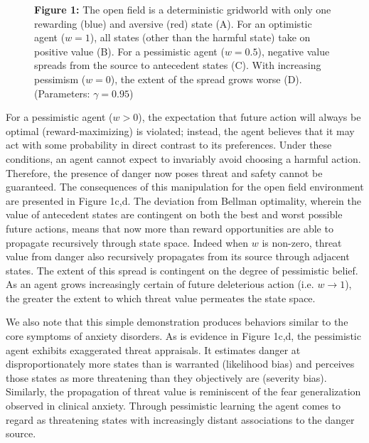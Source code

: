 \documentclass[11pt]{article} %
\begin{document}
\begin{figure}
  \centerline{%
  }
  \par \textbf{Figure 1:} The open field is a deterministic gridworld with only one rewarding (blue) and aversive (red) state (A). For an optimistic agent ($w=1$), all states (other than the harmful state) take on positive value (B). For a pessimistic agent ($w=0.5$), negative value spreads from the source to antecedent states (C). With increasing pessimism ($w=0$), the extent of the spread grows worse (D). (Parameters: $\gamma = 0.95$)
\end{figure}

For a pessimistic agent ($w > 0$), the expectation that future action will always be optimal (reward-maximizing) is violated; instead, the agent believes that it may act with some probability in direct contrast to its preferences. Under these conditions, an agent cannot expect to invariably avoid choosing a harmful action. Therefore, the presence of danger now poses threat and safety cannot be guaranteed. The consequences of this manipulation for the open field environment are presented in Figure 1c,d. The deviation from Bellman optimality, wherein the value of antecedent states are contingent on both the best and worst possible future actions, means that now more than reward opportunities are able to propagate recursively through state space. Indeed when $w$ is non-zero, threat value from danger also recursively propagates from its source through adjacent states. The extent of this spread is contingent on the degree of pessimistic belief. As an agent grows increasingly certain of future deleterious action (i.e. $w \rightarrow 1$), the greater the extent to which threat value permeates the state space.

We also note that this simple demonstration produces behaviors similar to the core symptoms of anxiety disorders. As is evidence in Figure 1c,d, the pessimistic agent exhibits exaggerated threat appraisals. It estimates danger at disproportionately more states than is warranted (likelihood bias) and perceives those states as more threatening than they objectively are (severity bias). Similarly, the propagation of threat value is reminiscent of the fear generalization observed in clinical anxiety. Through pessimistic learning the agent comes to regard as threatening states with increasingly distant associations to the danger source.
\end{document}
